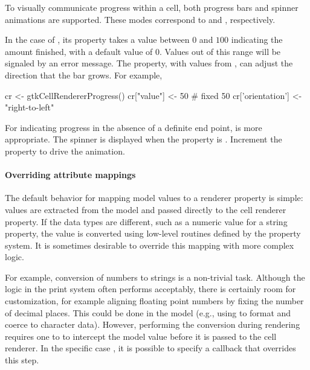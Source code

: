 To visually communicate progress within a cell, both progress bars and
spinner animations are supported. These modes correspond to
 and ,
respectively.

In the case of , its 
property takes a value between $0$ and $100$ indicating the amount
finished, with a default value of $0$. Values out of this range will
be signaled by an error message.  The  property,
with values from , can adjust the
direction that the bar grows.  For example,

\begin{Schunk}
\begin{Sinput}
 cr <- gtkCellRendererProgress()
 cr["value"] <- 50                       # fixed 50%
 cr['orientation'] <- "right-to-left"
\end{Sinput}
\end{Schunk}

For indicating progress in the absence of a definite end point,
 is more appropriate. The spinner is
displayed when the  property is . Increment
the  property to drive the animation.

\paragraph{Overriding attribute mappings}

The default behavior for mapping model values to a renderer property
is simple: values are extracted from the model and passed directly to
the cell renderer property. If the data types are different, such as a
numeric value for a string property, the value is converted using
low-level routines defined by the property system. It is sometimes desirable to override this mapping with more complex logic.

For example, conversion of numbers to strings is a non-trivial
task. Although the logic in the \R\/ print system often performs
acceptably, there is certainly room for customization, for example
aligning floating point numbers by fixing the number of decimal
places. This could be done in the model (e.g., using
 to format and coerce to character data). However,
performing the conversion during rendering requires one to to
intercept the model value before it is passed to the cell renderer. In
the specific case , it is possible to specify a
callback that overrides this step.  

